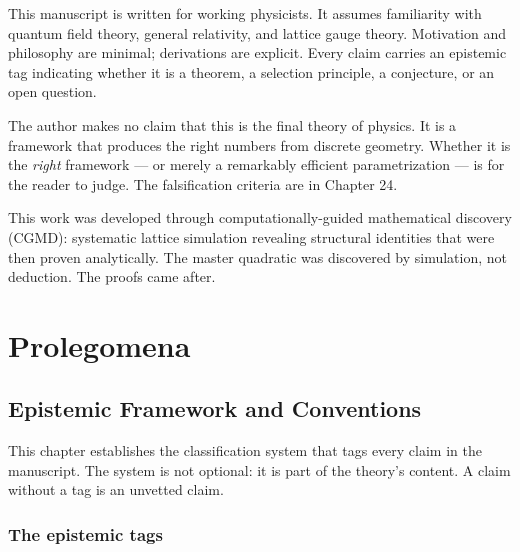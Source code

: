 \documentclass[
  11pt,
  letterpaper,
  twoside,
  openany]{book}
\makeatletter
\let\orig@section\section
\renewcommand{\section}{\needspace{8\baselineskip}\orig@section}
\makeatother
\begin{document}
This manuscript is written for working physicists. It assumes
familiarity with quantum field theory, general relativity, and lattice
gauge theory. Motivation and philosophy are minimal; derivations are
explicit. Every claim carries an epistemic tag indicating whether it is
a theorem, a selection principle, a conjecture, or an open question.

The author makes no claim that this is the final theory of physics. It
is a framework that produces the right numbers from discrete geometry.
Whether it is the \emph{right} framework --- or merely a remarkably
efficient parametrization --- is for the reader to judge. The
falsification criteria are in Chapter 24.

\begin{tcolorbox}[enhanced jigsaw, colbacktitle=quarto-callout-note-color!10!white, titlerule=0mm, bottomtitle=1mm, bottomrule=.15mm, colback=white, arc=.35mm, breakable, toprule=.15mm, title=\textcolor{quarto-callout-note-color}{\faInfo}\hspace{0.5em}{Methodology}, rightrule=.15mm, coltitle=black, leftrule=.75mm, colframe=quarto-callout-note-color-frame, toptitle=1mm, opacityback=0, opacitybacktitle=0.6, left=2mm]

This work was developed through computationally-guided mathematical
discovery (CGMD): systematic lattice simulation revealing structural
identities that were then proven analytically. The master quadratic was
discovered by simulation, not deduction. The proofs came after.

\end{tcolorbox}

\part{Prolegomena}

\chapter{Epistemic Framework and Conventions}\label{sec-epistemic}

This chapter establishes the classification system that tags every claim
in the manuscript. The system is not optional: it is part of the
theory's content. A claim without a tag is an unvetted claim.

\section{The epistemic tags}\label{the-epistemic-tags}
\end{document}

